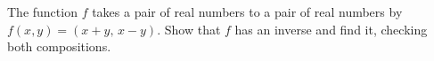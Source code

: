 The function $f$ takes a pair of real numbers to a pair of real numbers by $f(x,y)=(x+y,\,x-y)$. Show that $f$ has an inverse and find it, checking both compositions.

